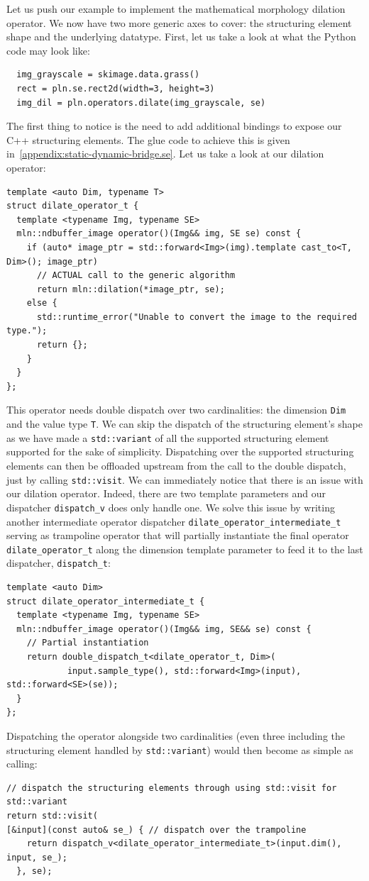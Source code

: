 Let us push our example to implement the mathematical morphology dilation operator. We now have two more generic axes to
cover: the structuring element shape and the underlying datatype. First, let us take a look at what the Python code may
look like:
\begin{verbatim}
  img_grayscale = skimage.data.grass()
  rect = pln.se.rect2d(width=3, height=3)
  img_dil = pln.operators.dilate(img_grayscale, se)
\end{verbatim}
The first thing to notice is the need to add additional bindings to expose our C++ structuring elements. The glue code
to achieve this is given in~\cref{appendix:static-dynamic-bridge.se}. Let us take a look at our dilation operator:
\begin{verbatim}
template <auto Dim, typename T>
struct dilate_operator_t {
  template <typename Img, typename SE>
  mln::ndbuffer_image operator()(Img&& img, SE se) const {
    if (auto* image_ptr = std::forward<Img>(img).template cast_to<T, Dim>(); image_ptr)
      // ACTUAL call to the generic algorithm
      return mln::dilation(*image_ptr, se);
    else {
      std::runtime_error("Unable to convert the image to the required type.");
      return {};
    }
  }
};
\end{verbatim}
This operator needs double dispatch over two cardinalities: the dimension \texttt{Dim} and the value type \texttt{T}. We
can skip the dispatch of the structuring element's shape as we have made a \texttt{std::variant} of all the supported
structuring element supported for the sake of simplicity. Dispatching over the supported structuring elements can then
be offloaded upstream from the call to the double dispatch, just by calling \texttt{std::visit}. We can immediately
notice that there is an issue with our dilation operator. Indeed, there are two template parameters and our dispatcher
\texttt{dispatch\_v} does only handle one. We solve this issue by writing another intermediate operator dispatcher
\texttt{dilate\_operator\_intermediate\_t} serving as trampoline operator that will partially instantiate the final
operator \texttt{dilate\_operator\_t} along the dimension template parameter to feed it to the last dispatcher,
\texttt{dispatch\_t}:
\begin{verbatim}
template <auto Dim>
struct dilate_operator_intermediate_t {
  template <typename Img, typename SE>
  mln::ndbuffer_image operator()(Img&& img, SE&& se) const {
    // Partial instantiation
    return double_dispatch_t<dilate_operator_t, Dim>(
            input.sample_type(), std::forward<Img>(input), std::forward<SE>(se));
  }
};
\end{verbatim}
Dispatching the operator alongside two cardinalities (even three including the structuring element handled by
\texttt{std::variant}) would then become as simple as calling:
\begin{verbatim}
// dispatch the structuring elements through using std::visit for std::variant
return std::visit(
[&input](const auto& se_) { // dispatch over the trampoline
    return dispatch_v<dilate_operator_intermediate_t>(input.dim(), input, se_);
  }, se);
\end{verbatim}

